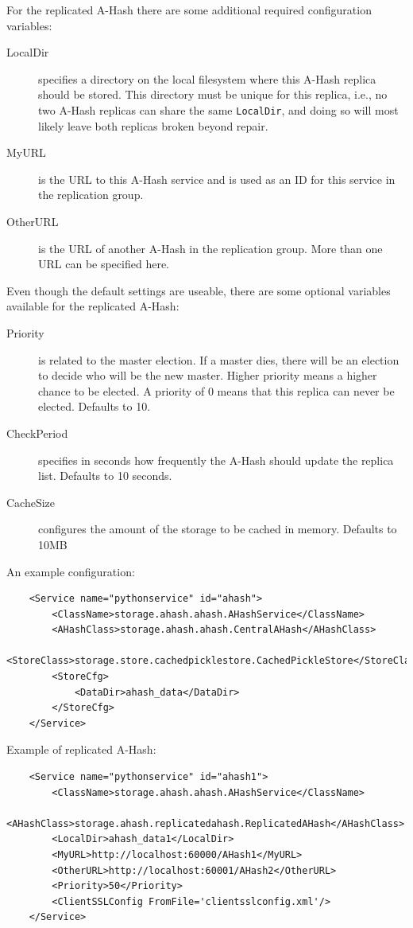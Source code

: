 \documentclass{book}
\begin{document}
For the replicated A-Hash there are some additional required configuration variables:

\begin{description}
    \item[LocalDir] specifies a directory on the local filesystem where this A-Hash replica should be stored. This directory must be unique for this replica, i.e., no two A-Hash replicas can share the same \verb!LocalDir!, and doing so will most likely leave both replicas broken beyond repair.
    \item[MyURL] is the URL to this A-Hash service and is used as an ID for this service in the replication group.
    \item[OtherURL] is the URL of another A-Hash in the replication group. More than one URL can be specified here.
\end{description}

Even though the default settings are useable, there are some optional variables available for the replicated A-Hash:
\begin{description}
    \item[Priority] is related to the master election. If a master dies, there will be an election to decide who will be the new master. Higher priority means a higher chance to be elected. A priority of 0 means that this replica can never be elected. Defaults to 10.
    \item[CheckPeriod] specifies in seconds how frequently the A-Hash should update the replica list. Defaults to 10 seconds.
    \item[CacheSize] configures the amount of the storage to be cached in memory. Defaults to 10MB
\end{description}


An example configuration:

\begin{verbatim}
    <Service name="pythonservice" id="ahash">
        <ClassName>storage.ahash.ahash.AHashService</ClassName>
        <AHashClass>storage.ahash.ahash.CentralAHash</AHashClass>
        <StoreClass>storage.store.cachedpicklestore.CachedPickleStore</StoreClass>
        <StoreCfg>
            <DataDir>ahash_data</DataDir>
        </StoreCfg>
    </Service>
\end{verbatim}

Example of replicated A-Hash:
\begin{verbatim}
    <Service name="pythonservice" id="ahash1">
        <ClassName>storage.ahash.ahash.AHashService</ClassName>
        <AHashClass>storage.ahash.replicatedahash.ReplicatedAHash</AHashClass>
        <LocalDir>ahash_data1</LocalDir>
        <MyURL>http://localhost:60000/AHash1</MyURL>
        <OtherURL>http://localhost:60001/AHash2</OtherURL>
        <Priority>50</Priority>
        <ClientSSLConfig FromFile='clientsslconfig.xml'/>
    </Service>
\end{verbatim}
\end{document}
